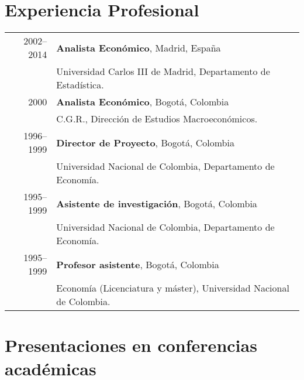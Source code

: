 \documentclass[11pt]{article}\usepackage[]{graphicx}\usepackage[]{color}
\begin{document}

\section{Experiencia Profesional} 

\begin{tabular}{rl{-2cm}}

2002--2014 &  \textbf{Analista Económico}, Madrid, España\\
& Universidad Carlos III de Madrid, Departamento de Estadística.\\

2000 & \textbf{Analista Económico}, Bogotá, Colombia\\
& C.G.R., Dirección de Estudios Macroeconómicos.\\

1996--1999 & \textbf{Director de Proyecto}, Bogotá, Colombia\\
& Universidad Nacional de Colombia, Departamento de Economía.\\

1995--1999 & \textbf{Asistente de investigación}, Bogotá, Colombia\\
& Universidad Nacional de Colombia, Departamento de Economía.}\\

1995--1999 & \textbf{Profesor asistente}, Bogotá, Colombia\\
& Economía (Licenciatura y máster), Universidad Nacional de Colombia.\\

\end{tabular}
\vspace{10pt}


\section{Presentaciones en conferencias académicas} 
\end{document}
